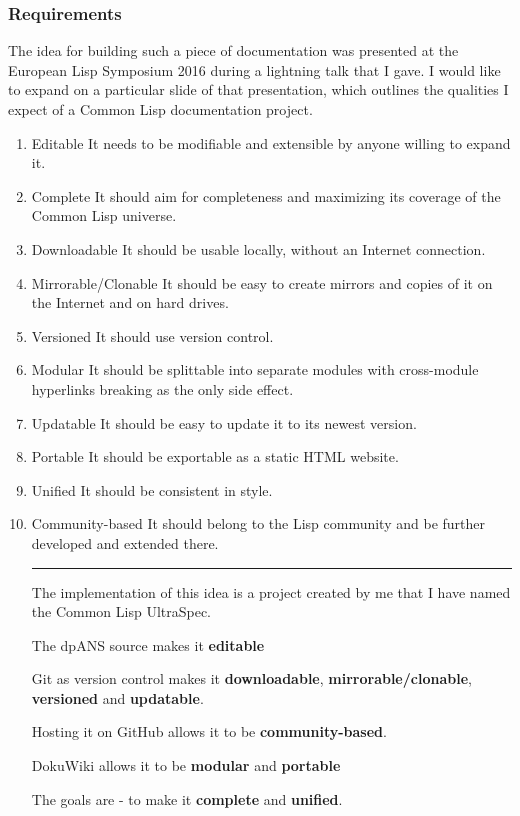 \documentclass[11pt]{article}
\begin{document}
\subsubsection{Requirements}
\label{sec:org536d3b8}
The idea for building such a piece of documentation was presented at the European Lisp Symposium 2016 during a lightning talk that I gave. I would like to expand on a particular slide of that presentation, which outlines the qualities I expect of a Common Lisp documentation project.
\begin{enumerate}
\item Editable
\label{sec:orgf8cd75a}
It needs to be modifiable and extensible by anyone willing to expand it.
\item Complete
\label{sec:orgff6ff49}
It should aim for completeness and maximizing its coverage of the Common Lisp universe.
\item Downloadable
\label{sec:org9c84938}
It should be usable locally, without an Internet connection.
\item Mirrorable/Clonable
\label{sec:orgf1e85d7}
It should be easy to create mirrors and copies of it on the Internet and on hard drives.
\item Versioned
\label{sec:org4b0d555}
It should use version control.
\item Modular
\label{sec:org97490a6}
It should be splittable into separate modules with cross-module hyperlinks breaking as the only side effect.
\item Updatable
\label{sec:org1f89973}
It should be easy to update it to its newest version.
\item Portable
\label{sec:org725a717}
It should be exportable as a static HTML website.
\item Unified
\label{sec:org7d95785}
It should be consistent in style.
\item Community-based
\label{sec:org80aa753}
It should belong to the Lisp community and be further developed and extended there.

\rule{\linewidth}{0.5pt}
The implementation of this idea is a project created by me that I have named the Common Lisp UltraSpec.

The dpANS source makes it \textbf{editable}

Git as version control makes it \textbf{downloadable}, \textbf{mirrorable/clonable}, \textbf{versioned} and \textbf{updatable}.

Hosting it on GitHub allows it to be \textbf{community-based}.

DokuWiki allows it to be \textbf{modular} and \textbf{portable}

The goals are - to make it \textbf{complete} and \textbf{unified}.
\end{enumerate}
\end{document}
